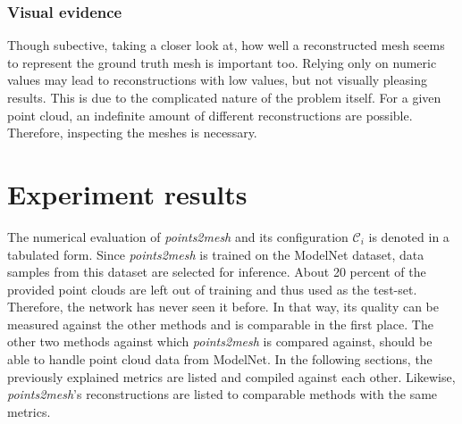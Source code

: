     \subsubsection*{Visual evidence}    
    Though subective, taking a closer look at, how well a reconstructed mesh seems to represent the ground truth mesh is important too. Relying only on 
    numeric values may lead to reconstructions with low values, but not visually pleasing results. This is due to the complicated nature of the problem itself.
    For a given point cloud, an indefinite amount of different reconstructions are possible. Therefore, inspecting the meshes is necessary.


\section{Experiment results}
\label{subsec:results}
    The numerical evaluation of \emph{points2mesh} and its configuration $\mathcal{C}_i$ is denoted in a tabulated form.
    Since \emph{points2mesh} is trained on the ModelNet dataset, data samples from this dataset are selected for inference. About 20 percent 
    of the provided point clouds are left out of training and thus used as the test-set. Therefore, the network has 
    never seen it before. In that way, its quality can be measured against the other methods and is comparable in the
    first place. The other two methods against which \emph{points2mesh} is compared against, should be able to handle
    point cloud data from ModelNet.
    In the following sections, the previously explained metrics are listed and compiled against each other.
    Likewise, \emph{points2mesh}'s reconstructions are listed to comparable methods with the same metrics.
    
